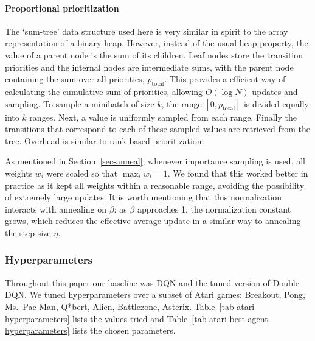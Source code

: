 \documentclass[a4paper]{article}
\begin{document}
\paragraph{Proportional prioritization}
The `sum-tree' data structure used here is very similar in spirit to the array representation of a binary heap.  However, instead of the usual heap property, the value of a parent node is the sum of its children.  Leaf nodes store the transition priorities and the internal nodes are intermediate sums, with the parent node containing the sum over all priorities, $p_{\text{total}}$.  This provides a efficient way of calculating the cumulative sum of priorities, allowing $O(\log N)$ updates and sampling.  To sample a minibatch of size $k$, the range $[0, p_{\text{total}}]$ is divided equally into $k$ ranges.  Next, a value is uniformly sampled from each range.  Finally the transitions that correspond to each of these sampled values are retrieved from the tree.  Overhead is similar to rank-based prioritization.

As mentioned in Section~\ref{sec-anneal}, whenever importance sampling is used, all weights $w_i$ were scaled so that $\max_i w_i = 1$.  We found that this worked better in practice as it kept all weights within a reasonable range, avoiding the possibility of extremely large updates. It is worth mentioning that this normalization interacts with annealing on $\beta$: as $\beta$ approaches 1, the normalization constant grows, which reduces the effective average update in a similar way to annealing the step-size $\eta$.

\subsubsection{Hyperparameters}

Throughout this paper our baseline was DQN and the tuned version of Double DQN.  We tuned hyperparameters over a subset of Atari games: Breakout, Pong, Ms.\ Pac-Man, Q*bert, Alien, Battlezone, Asterix.  Table~\ref{tab-atari-hyperparameters} lists the values tried and Table~\ref{tab-atari-best-agent-hyperparameters} lists the chosen parameters.

\begin{table}[!hp]
\centering


\caption{
\label{tab-atari-hyperparameters}
Hyperparameters considered in experiments.  Here $\eta_{\text{baseline}} = 0.00025$.
}
\end{table}
\end{document}

